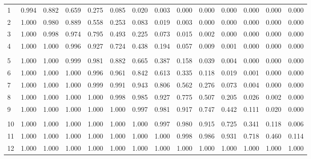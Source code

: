 \documentclass[
]{article}
\begin{document}
\begin{longtable}[t]{lrrrrrrrrrrrrr}
\hspace{1em}1 & 0.994 & 0.882 & 0.659 & 0.275 & 0.085 & 0.020 & 0.003 & 0.000 & 0.000 & 0.000 & 0.000 & 0.000 & 0.000\\
\hspace{1em}2 & 1.000 & 0.980 & 0.889 & 0.558 & 0.253 & 0.083 & 0.019 & 0.003 & 0.000 & 0.000 & 0.000 & 0.000 & 0.000\\
\hspace{1em}3 & 1.000 & 0.998 & 0.974 & 0.795 & 0.493 & 0.225 & 0.073 & 0.015 & 0.002 & 0.000 & 0.000 & 0.000 & 0.000\\
\hspace{1em}4 & 1.000 & 1.000 & 0.996 & 0.927 & 0.724 & 0.438 & 0.194 & 0.057 & 0.009 & 0.001 & 0.000 & 0.000 & 0.000\\
\addlinespace[-.7em]
\multicolumn{14}{l}{ }\\
\hspace{1em}5 & 1.000 & 1.000 & 0.999 & 0.981 & 0.882 & 0.665 & 0.387 & 0.158 & 0.039 & 0.004 & 0.000 & 0.000 & 0.000\\
\hspace{1em}6 & 1.000 & 1.000 & 1.000 & 0.996 & 0.961 & 0.842 & 0.613 & 0.335 & 0.118 & 0.019 & 0.001 & 0.000 & 0.000\\
\hspace{1em}7 & 1.000 & 1.000 & 1.000 & 0.999 & 0.991 & 0.943 & 0.806 & 0.562 & 0.276 & 0.073 & 0.004 & 0.000 & 0.000\\
\hspace{1em}8 & 1.000 & 1.000 & 1.000 & 1.000 & 0.998 & 0.985 & 0.927 & 0.775 & 0.507 & 0.205 & 0.026 & 0.002 & 0.000\\
\hspace{1em}9 & 1.000 & 1.000 & 1.000 & 1.000 & 1.000 & 0.997 & 0.981 & 0.917 & 0.747 & 0.442 & 0.111 & 0.020 & 0.000\\
\addlinespace[-.7em]
\multicolumn{14}{l}{ }\\
\hspace{1em}10 & 1.000 & 1.000 & 1.000 & 1.000 & 1.000 & 1.000 & 0.997 & 0.980 & 0.915 & 0.725 & 0.341 & 0.118 & 0.006\\
\hspace{1em}11 & 1.000 & 1.000 & 1.000 & 1.000 & 1.000 & 1.000 & 1.000 & 0.998 & 0.986 & 0.931 & 0.718 & 0.460 & 0.114\\
\hspace{1em}12 & 1.000 & 1.000 & 1.000 & 1.000 & 1.000 & 1.000 & 1.000 & 1.000 & 1.000 & 1.000 & 1.000 & 1.000 & 1.000\\
\bottomrule
\end{longtable}
\end{document}
